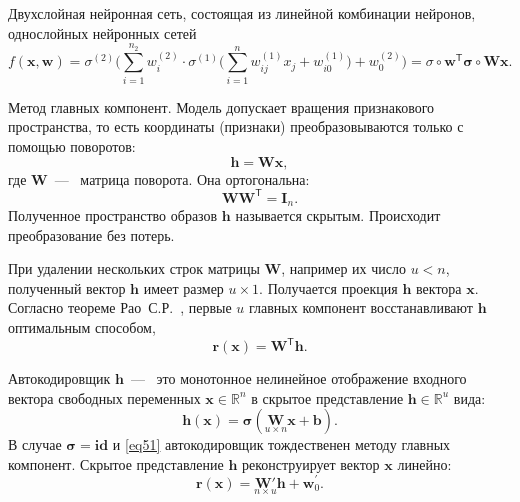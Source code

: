 \documentclass[12pt, twoside]{article}
\newcommand{\xb}{{\mathbf{x}}}
\newcommand{\sigmab}{{\boldsymbol{\sigma}}}
\newcommand{\x}{{\mathbf{x}}}
\newcommand{\w}{{\mathbf{W}}}
\newcommand{\wm}{{\mathbf{w}}}
\begin{document}
Двухслойная нейронная сеть, состоящая из линейной комбинации нейронов, однослойных нейронных сетей
\begin{equation}\label{eq12}
f(\xb,\wm)=\sigma^{(2)}\bigg(\sum_{i=1}^{n_2}w_i^{(2)}\cdot\sigma^{(1)}\Bigg(\sum_{i=1}^{n}w_{ij}^{(1)}x_j+w_{i0}^{(1)}\Bigg)+w_0^{(2)}\bigg) = \sigma\circ \wm^{\mathsf{T}}\sigmab\circ \w\xb.
\end{equation}

Метод главных компонент. Модель допускает вращения признакового пространства, то есть координаты (признаки) преобразовываются только с помощью поворотов:
\begin{equation}
\mathbf{h} = \w\x,
\end{equation}
где $\w$~---~ матрица поворота. Она ортогональна: 
\begin{equation}\label{eq51}
\w\w^\mathsf{T} = \mathbf{I}_n.
\end{equation}
Полученное пространство образов $\mathbf{h}$ называется скрытым. Происходит преобразование без потерь.

При удалении нескольких строк матрицы $\w$, например их число $u < n$,  полученный вектор $\mathbf{h}$ имеет размер $u \times 1$. Получается проекция $\mathbf{h}$ вектора $\mathbf{x}$. Согласно теореме Рао~С.Р.~\cite{fourth}, первые $u$ главных компонент восстанавливают $\mathbf{h}$ оптимальным способом,
\begin{equation}\label{eq45}
\textbf{r}(\textbf{x}) = \w^{\mathsf{T}}\mathbf{h}.
\end{equation}

Автокодировщик $\mathbf{h}$~---~ это монотонное нелинейное отображение входного вектора свободных переменных $\textbf{x} \in \mathbb{R}^n$ в скрытое представление $\mathbf{h} \in \mathbb{R}^{u}$ вида:
\begin{equation}\label{eq52}
\mathbf{h}(\x) = \sigmab(\underset{u \times n}{\w}\x + \mathbf{b}) .
\end{equation}
В случае $\sigmab = \textbf{id}$ и \eqref{eq51} автокодировщик тождественен методу главных компонент. Скрытое представление $\textbf{h}$ реконструирует вектор $\textbf{x}$ линейно:
\begin{equation}\label{eq53}
\mathbf{r}(\x) = \underset{n \times u}{\w{'}}\mathbf{h} + \wm_{0}^{'} .
\end{equation}
\end{document}

